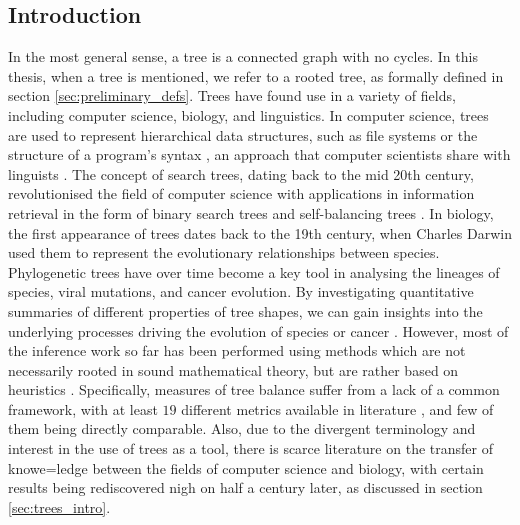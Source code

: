 \subsection{Introduction}
In the most general sense, a tree is a connected graph with no cycles. In this thesis, when a tree is
mentioned, we refer to a rooted tree, as formally defined in section \ref{sec:preliminary_defs}.
Trees have found use in a variety of fields, including computer science, biology, and linguistics.
In computer science, trees are used to represent hierarchical data structures, such as file systems \cite{nievergelt_binary_1974}
or the structure of a program's syntax \cite{knuth_semantics_1968}, an approach that computer scientists
share with linguists \cite{chomsky_syntactic_1957}. The concept of search trees, dating back to the mid 20th century,
revolutionised the field of computer science with applications in information retrieval in the form of
binary search trees and self-balancing trees \cite{nievergelt_binary_1972, knuth_art_1997}. In biology,
the first appearance of trees dates back to the 19th century, when Charles Darwin used them to represent the evolutionary
relationships between species. Phylogenetic trees have over time become a key tool in analysing the
lineages of species, viral mutations, and cancer evolution. By investigating quantitative summaries of different properties
of tree shapes, we can gain insights into the underlying processes driving the evolution of species \cite{mooers_inferring_1997}
or cancer \cite{scott_inferring_2018, noble_spatial_2022}. However, most of the inference work so far has been performed
using methods which are not necessarily rooted in sound mathematical theory, but are rather based on heuristics \cite{omeara_evolutionary_2012}.
Specifically, measures of tree balance suffer from a lack of a common framework, with at least $19$ different metrics available
in literature \cite{fischer_tree_2021}, and few of them being directly comparable. Also, due to the divergent terminology and
interest in the use of trees as a tool, there is scarce literature on the transfer of knowe=ledge between the fields of computer science
and biology, with certain results being rediscovered nigh on half a century later, as discussed in section \ref{sec:trees_intro}.

